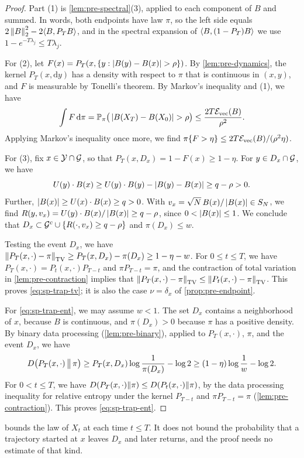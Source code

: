 \begin{proof}
Part (1) is \cref{lem:pre-spectral}(3), applied to each component of $B$ and summed. In words, both endpoints have law $\pi$, so the left side equals $2\left\lVert B\right\rVert_2^2-2\langle B,P_TB\rangle$, and in the spectral expansion of $\langle B,(1-P_T)B\rangle$ we use $1-e^{-T\lambda_j}\le T\lambda_j$.

For (2), let $F(x)=P_T(x,\{y:\abs{B(y)-B(x)}>\rho\})$. By \cref{lem:pre-dynamics}, the kernel $P_T(x,\mathrm dy)$ has a density with respect to $\pi$ that is continuous in $(x,y)$, and $F$ is measurable by Tonelli's theorem. By Markov's inequality and (1), we have
\[
\int F\dd\pi=\Pp_\pi\big(\abs{B(X_T)-B(X_0)}>\rho\big)\le\frac{2T\cE_{\rm vec}(B)}{\rho^2}.
\]
Applying Markov's inequality once more, we find $\pi\{F>\eta\}\le2T\mathcal E_{\rm vec}(B)/(\rho^2\eta)$.

For (3), fix $x\in\mathcal Y\cap\mathcal G$, so that $P_T(x,D_x)=1-F(x)\ge1-\eta$. For $y\in D_x\cap\mathcal G$, we have
\[
U(y)\cdot B(x)\ge U(y)\cdot B(y)-\left|B(y)-B(x)\right|\ge q-\rho>0.
\]
Further, $\left|B(x)\right|\ge U(x)\cdot B(x)\ge q>0$. With $v_x=\sqrt N\,B(x)/\left|B(x)\right|\in S_N$, we find $R(y,v_x)=U(y)\cdot B(x)/\left|B(x)\right|\ge q-\rho$, since $0<\left|B(x)\right|\le1$. We conclude that $D_x\subset\mathcal G^c\cup\{R(\cdot,v_x)\ge q-\rho\}$ and $\pi(D_x)\le w$.

Testing the event $D_x$, we have $\left\lVert P_T(x,\cdot)-\pi\right\rVert_{\mathrm{TV}}\ge P_T(x,D_x)-\pi(D_x)\ge1-\eta-w$. For $0\le t\le T$, we have $P_T(x,\cdot)=P_t(x,\cdot)P_{T-t}$ and $\pi P_{T-t}=\pi$, and the contraction of total variation in \cref{lem:pre-contraction} implies that $\left\lVert P_T(x,\cdot)-\pi\right\rVert_{\mathrm{TV}}\le\left\lVert P_t(x,\cdot)-\pi\right\rVert_{\mathrm{TV}}$. This proves \eqref{eq:sp-trap-tv}; it is also the case $\nu=\delta_x$ of \cref{prop:pre-endpoint}.

For \eqref{eq:sp-trap-ent}, we may assume $w<1$. The set $D_x$ contains a neighborhood of $x$, because $B$ is continuous, and $\pi(D_x)>0$ because $\pi$ has a positive density. By binary data processing (\cref{lem:pre-binary}), applied to $P_T(x,\cdot)$, $\pi$, and the event $D_x$, we have
\[
D\big(P_T(x,\cdot)\,\big\|\,\pi\big)\ge P_T(x,D_x)\log\frac1{\pi(D_x)}-\log2\ge(1-\eta)\log\frac1w-\log2.
\]
For $0<t\le T$, we have $D(P_T(x,\cdot)\|\pi)\le D(P_t(x,\cdot)\|\pi)$, by the data processing inequality for relative entropy under the kernel $P_{T-t}$ and $\pi P_{T-t}=\pi$ (\cref{lem:pre-contraction}). This proves \eqref{eq:sp-trap-ent}.
\end{proof}

 bounds the law of $X_t$ at each time $t\le T$. It does not bound the probability that a trajectory started at $x$ leaves $D_x$ and later returns, and the proof needs no estimate of that kind.
